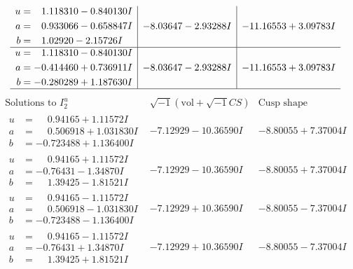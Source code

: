 \documentclass[1p]{elsarticle_modified}
\theoremstyle{definition}
\newcommand{\I}{\sqrt{-1}}
\begin{document}
$$\begin{array}{c|c|c}
\begin{aligned}
u &= \phantom{-}1.118310 - 0.840130 I \\
a &= \phantom{-}0.933066 - 0.658847 I \\
b &= \phantom{-}1.02920 - 2.15726 I\end{aligned}
 & -8.03647 - 2.93288 I & -11.16553 + 3.09783 I \\ \hline\begin{aligned}
u &= \phantom{-}1.118310 - 0.840130 I \\
a &= -0.414460 + 0.736911 I \\
b &= -0.280289 + 1.187630 I\end{aligned}
 & -8.03647 - 2.93288 I & -11.16553 + 3.09783 I\\
 \hline 
 \end{array}$$\newpage$$\begin{array}{c|c|c}  
\text{Solutions to }I^u_{2}& \I (\text{vol} + \sqrt{-1}CS) & \text{Cusp shape}\\
 \hline 
\begin{aligned}
u &= \phantom{-}0.94165 + 1.11572 I \\
a &= \phantom{-}0.506918 + 1.031830 I \\
b &= -0.723488 + 1.136400 I\end{aligned}
 & -7.12929 - 10.36590 I & -8.80055 + 7.37004 I \\ \hline\begin{aligned}
u &= \phantom{-}0.94165 + 1.11572 I \\
a &= -0.76431 - 1.34870 I \\
b &= \phantom{-}1.39425 - 1.81521 I\end{aligned}
 & -7.12929 - 10.36590 I & -8.80055 + 7.37004 I \\ \hline\begin{aligned}
u &= \phantom{-}0.94165 - 1.11572 I \\
a &= \phantom{-}0.506918 - 1.031830 I \\
b &= -0.723488 - 1.136400 I\end{aligned}
 & -7.12929 + 10.36590 I & -8.80055 - 7.37004 I \\ \hline\begin{aligned}
u &= \phantom{-}0.94165 - 1.11572 I \\
a &= -0.76431 + 1.34870 I \\
b &= \phantom{-}1.39425 + 1.81521 I\end{aligned}
 & -7.12929 + 10.36590 I & -8.80055 - 7.37004 I \\ \hline\begin{aligned}

\end{aligned}
\end{array}$$
\end{document}
